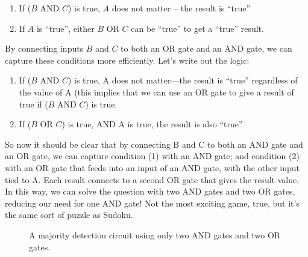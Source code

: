 \begin{enumerate}
\item If ($B$ AND $C$) is true, $A$ does not matter -- the result is ``true''

\item If $A$ is ``true'', either $B$ OR $C$ can be ``true'' to get a ``true'' result.

\end{enumerate}

By connecting inputs $B$ and $C$ to both an OR gate and an AND gate, we can capture these conditions more efficiently. Let's write out the logic:

\begin{enumerate}
\item If ($B$ AND $C$) is true, A does not matter---the result is ``true'' regardless of the value of A (this implies that we can use an OR gate to give a result of true if ($B$ AND $C$) is true.

\item If ($B$ OR $C$) is true, AND A is true, the result is also ``true''
\end{enumerate}

So now it should be clear that by connecting B and C to both an AND gate and an OR gate, we can capture condition (1) with an AND gate; and condition (2) with an OR gate that feeds into an input of an AND gate, with the other input tied to A. 
Each result connects to a second OR gate that gives the result value.
In this way, we can solve the question with two AND gates and two OR gates, reducing our need for one AND gate! 
Not the most exciting game, true, but it's the same sort of puzzle as Sudoku.

\begin{figure}[hb!]
\begin{center}



\caption{A majority detection circuit using only two AND gates and two OR gates.}

\end{center}
\end{figure}

% 